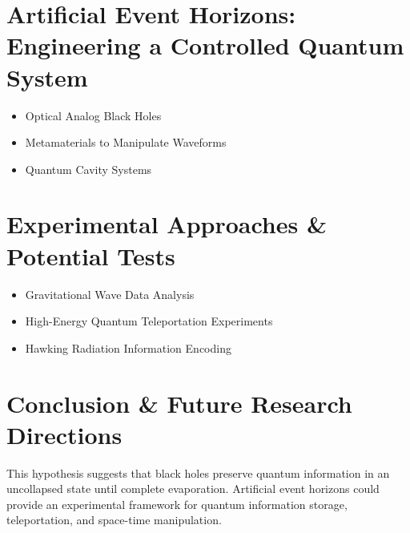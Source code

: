 \documentclass{article}
\begin{document}
\section{Artificial Event Horizons: Engineering a Controlled Quantum System}
\begin{itemize}
    \item Optical Analog Black Holes
    \item Metamaterials to Manipulate Waveforms
    \item Quantum Cavity Systems
\end{itemize}

\section{Experimental Approaches \& Potential Tests}
\begin{itemize}
    \item Gravitational Wave Data Analysis
    \item High-Energy Quantum Teleportation Experiments
    \item Hawking Radiation Information Encoding
\end{itemize}

\section{Conclusion \& Future Research Directions}
This hypothesis suggests that black holes preserve quantum information in an uncollapsed state until complete evaporation. Artificial event horizons could provide an experimental framework for quantum information storage, teleportation, and space-time manipulation.
\end{document}

